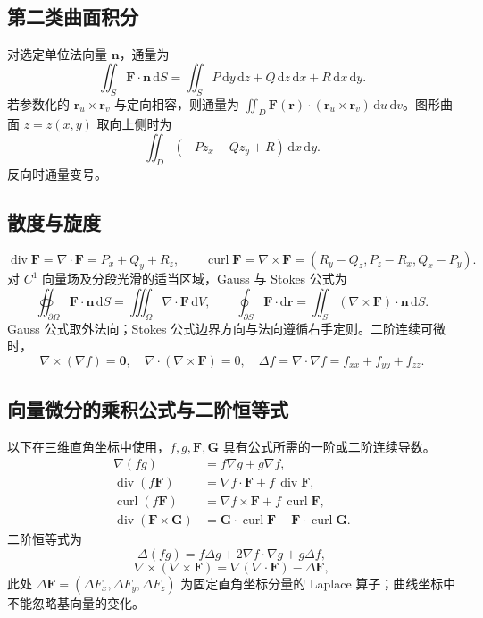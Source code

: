 \documentclass[../main.tex]{subfiles}
\begin{document}
\subsection{第二类曲面积分}
对选定单位法向量 $\bm n$，通量为
\[
\iint_S\bm F\cdot\bm n\,\mathrm dS
=\iint_S P\,\mathrm dy\,\mathrm dz+Q\,\mathrm dz\,\mathrm dx+R\,\mathrm dx\,\mathrm dy.
\]
若参数化的 $\bm r_u\times\bm r_v$ 与定向相容，则通量为 $\iint_D\bm F(\bm r)\cdot(\bm r_u\times\bm r_v)\,\mathrm du\,\mathrm dv$。图形曲面 $z=z(x,y)$ 取向上侧时为
\[
\iint_D(-Pz_x-Qz_y+R)\,\mathrm dx\,\mathrm dy.
\]
反向时通量变号。
\subsection{散度与旋度}
\[
\operatorname{div}\bm F=\nabla\cdot\bm F=P_x+Q_y+R_z,\qquad
\operatorname{curl}\bm F=\nabla\times\bm F=(R_y-Q_z,P_z-R_x,Q_x-P_y).
\]
对 $C^1$ 向量场及分段光滑的适当区域，Gauss 与 Stokes 公式为
\[
\oiint_{\partial\Omega}\bm F\cdot\bm n\,\mathrm dS
=\iiint_\Omega\nabla\cdot\bm F\,\mathrm dV,\qquad
\oint_{\partial S}\bm F\cdot\mathrm d\bm r
=\iint_S(\nabla\times\bm F)\cdot\bm n\,\mathrm dS.
\]
Gauss 公式取外法向；Stokes 公式边界方向与法向遵循右手定则。二阶连续可微时，
\[
\nabla\times(\nabla f)=\bm0,\quad
\nabla\cdot(\nabla\times\bm F)=0,\quad
\Delta f=\nabla\cdot\nabla f=f_{xx}+f_{yy}+f_{zz}.
\]
\subsection{向量微分的乘积公式与二阶恒等式}
以下在三维直角坐标中使用，$f,g,\bm F,\bm G$ 具有公式所需的一阶或二阶连续导数。
\begin{align*}
\nabla(fg)&=f\nabla g+g\nabla f,\\
\operatorname{div}(f\bm F)&=\nabla f\cdot\bm F+f\,\operatorname{div}\bm F,\\
\operatorname{curl}(f\bm F)&=\nabla f\times\bm F+f\,\operatorname{curl}\bm F,\\
\operatorname{div}(\bm F\times\bm G)
&=\bm G\cdot\operatorname{curl}\bm F-\bm F\cdot\operatorname{curl}\bm G.
\end{align*}
二阶恒等式为
\[
\Delta(fg)=f\Delta g+2\nabla f\cdot\nabla g+g\Delta f,
\]
\[
\nabla\times(\nabla\times\bm F)
=\nabla(\nabla\cdot\bm F)-\Delta\bm F,
\]
此处 $\Delta\bm F=(\Delta F_x,\Delta F_y,\Delta F_z)$ 为固定直角坐标分量的 Laplace 算子；曲线坐标中不能忽略基向量的变化。
\end{document}

